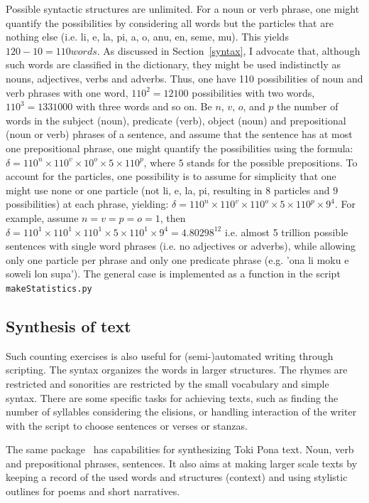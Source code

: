 \documentclass{article}
\newcommand{\tttt}[1]{\texttt{#1}}
\begin{document}
Possible syntactic structures are unlimited.
For a noun or verb phrase, one might quantify the possibilities
by considering all words but the particles that are nothing else
(i.e. li, e, la, pi, a, o, anu, en, seme, mu).
This yields $120-10=110 words$.
As discussed in Section~\ref{syntax},
I advocate that, although such words are classified in the dictionary,
they might be used indistinctly as nouns, adjectives,
verbs and adverbs.
Thus, one have 110 possibilities of noun and verb phrases with
one word, $110^2=12100$ possibilities with two words,
$110^3=1331000$ with three words and so on.
Be $n$, $v$, $o$, and $p$ the number of words in the subject (noun), predicate
(verb), object (noun) and prepositional (noun or verb) phrases of a sentence,
and assume that the sentence has at most one prepositional phrase,
one might quantify the possibilities using the formula:
$\delta = 110^n\times 110^v\times 10^o \times 5\times 110^p$,
where $5$ stands for the possible prepositions.
To account for the particles, one possibility is
to assume for simplicity that one might use none or one particle
(not li, e, la, pi, resulting in $8$ particles and $9$ possibilities)
at each phrase, yielding:
$\delta = 110^n\times 110^v\times 110^o \times 5\times 110^p\times 9^4$.
For example, assume $n=v=p=o=1$, then
$\delta=110^1\times 110^1\times 110^1 \times 5\times 110^1\times 9^4=
4.80298^{12}$
i.e. almost 5 trillion possible
sentences with single word phrases (i.e. no adjectives or adverbs),
while allowing only one particle per phrase
and only one predicate phrase 
(e.g. 'ona li moku e soweli lon supa').
The general case is implemented as a function
in the script \tttt{makeStatistics.py}~\cite{tokipona}

\subsection{Synthesis of text}\label{synth}
Such counting exercises is also useful
for (semi-)automated writing through scripting.
The syntax organizes the words in larger structures.
The rhymes are restricted and sonorities are
restricted by the small vocabulary and simple syntax.
There are some specific tasks for achieving texts,
such as finding the number of syllables considering the elisions,
or handling interaction of the writer with the script
to choose sentences or verses or stanzas.

The same package~\cite{tokipona}
has capabilities for synthesizing Toki Pona text.
Noun, verb and prepositional phrases,
sentences.
It also aims at making larger scale texts
by keeping a record of the used words and structures (context)
and using stylistic outlines for poems and short narratives.
\end{document}
